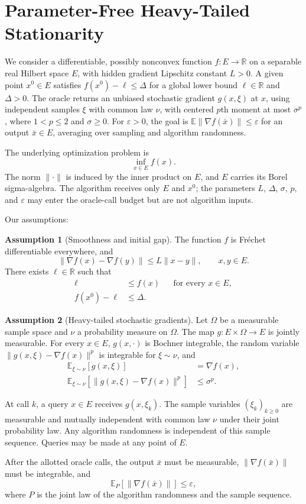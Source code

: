 \documentclass[10pt]{article}
\theoremstyle{definition}
\newtheorem{assumption}{Assumption}
\begin{document}
\section*{Parameter-Free Heavy-Tailed Stationarity}
We consider a differentiable, possibly nonconvex function $f:E\to\mathbb{R}$ on a separable real Hilbert space $E$, with hidden gradient Lipschitz constant $L>0$. A given point $x^0\in E$ satisfies $f(x^0)-\ell\leq\Delta$ for a global lower bound $\ell\in\mathbb{R}$ and $\Delta>0$. The oracle returns an unbiased stochastic gradient $g(x,\xi)$ at $x$, using independent samples $\xi$ with common law $\nu$, with centered $p$th moment at most $\sigma^p$, where $1<p\leq2$ and $\sigma\geq0$. For $\varepsilon>0$, the goal is $\mathbb{E}\|\nabla f(\bar{x})\|\leq\varepsilon$ for an output $\bar{x}\in E$, averaging over sampling and algorithm randomness.

The underlying optimization problem is
\[
\inf_{x\in E} f(x).
\]
The norm $\|\cdot\|$ is induced by the inner product on $E$, and $E$ carries its Borel sigma-algebra. The algorithm receives only $E$ and $x^0$; the parameters $L$, $\Delta$, $\sigma$, $p$, and $\varepsilon$ may enter the oracle-call budget but are not algorithm inputs.

Our assumptions:
\begin{assumption}[Smoothness and initial gap]
The function $f$ is Fr\'echet differentiable everywhere, and
\[
\|\nabla f(x)-\nabla f(y)\|\leq L\|x-y\|,
\qquad x,y\in E.
\]
There exists $\ell\in\mathbb{R}$ such that
\[
\begin{aligned}
\ell&\leq f(x) &&\text{for every }x\in E,\\
f(x^0)-\ell&\leq\Delta.
\end{aligned}
\]
\end{assumption}

\begin{assumption}[Heavy-tailed stochastic gradients]
Let $\Omega$ be a measurable sample space and $\nu$ a probability measure on $\Omega$. The map $g:E\times\Omega\to E$ is jointly measurable. For every $x\in E$, $g(x,\cdot)$ is Bochner integrable, the random variable $\|g(x,\xi)-\nabla f(x)\|^p$ is integrable for $\xi\sim\nu$, and
\[
\begin{aligned}
\mathbb{E}_{\xi\sim\nu}[g(x,\xi)]&=\nabla f(x),\\
\mathbb{E}_{\xi\sim\nu}
 [\|g(x,\xi)-\nabla f(x)\|^p]&\leq\sigma^p.
\end{aligned}
\]
\end{assumption}

At call $k$, a query $x\in E$ receives $g(x,\xi_k)$. The sample variables $(\xi_k)_{k\geq0}$ are measurable and mutually independent with common law $\nu$ under their joint probability law. Any algorithm randomness is independent of this sample sequence. Queries may be made at any point of $E$.

After the allotted oracle calls, the output $\bar{x}$ must be measurable, $\|\nabla f(\bar{x})\|$ must be integrable, and
\[
\mathbb{E}_{P}[\|\nabla f(\bar{x})\|]\leq\varepsilon,
\]
where $P$ is the joint law of the algorithm randomness and the sample sequence.
\end{document}
